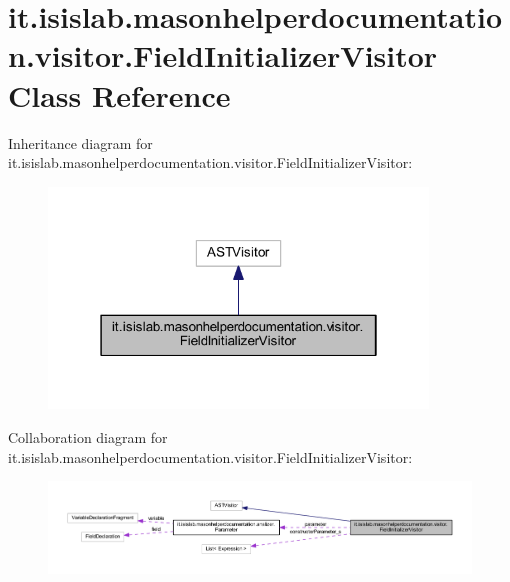 \hypertarget{classit_1_1isislab_1_1masonhelperdocumentation_1_1visitor_1_1_field_initializer_visitor}{\section{it.\-isislab.\-masonhelperdocumentation.\-visitor.\-Field\-Initializer\-Visitor Class Reference}
\label{classit_1_1isislab_1_1masonhelperdocumentation_1_1visitor_1_1_field_initializer_visitor}
}


Inheritance diagram for it.\-isislab.\-masonhelperdocumentation.\-visitor.\-Field\-Initializer\-Visitor\-:
\nopagebreak
\begin{figure}[H]
\begin{center}
\leavevmode
\includegraphics[width=286pt]{classit_1_1isislab_1_1masonhelperdocumentation_1_1visitor_1_1_field_initializer_visitor__inherit__graph}
\end{center}
\end{figure}


Collaboration diagram for it.\-isislab.\-masonhelperdocumentation.\-visitor.\-Field\-Initializer\-Visitor\-:
\nopagebreak
\begin{figure}[H]
\begin{center}
\leavevmode
\includegraphics[width=350pt]{classit_1_1isislab_1_1masonhelperdocumentation_1_1visitor_1_1_field_initializer_visitor__coll__graph}
\end{center}
\end{figure}
